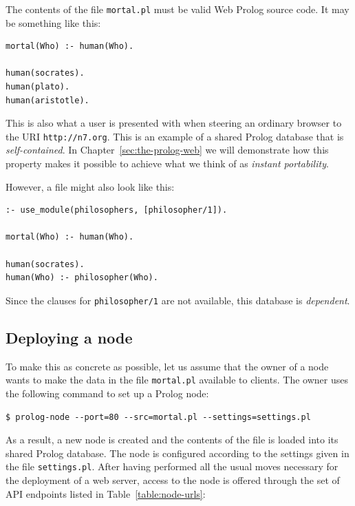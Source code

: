 The contents of the file \texttt{mortal.pl} must be valid Web Prolog source code. It may be something like this:

\begin{verbatim}
mortal(Who) :- human(Who).

human(socrates).
human(plato).
human(aristotle).
\end{verbatim}

\noindent This is also what a user is presented with when steering an ordinary browser to the URI  \texttt{http://n7.org}. This is an example of a shared Prolog database that is  \textit{self-contained}. In Chapter~\ref{sec:the-prolog-web} we will demonstrate how this property makes it possible to achieve what we think of as \textit{instant portability}.

However, a file might also look like this:

\begin{verbatim}
:- use_module(philosophers, [philosopher/1]).

mortal(Who) :- human(Who).

human(socrates).
human(Who) :- philosopher(Who).
\end{verbatim}

\noindent Since the clauses for \texttt{philosopher/1} are not available, this database is \textit{dependent}.

\subsection{Deploying a node}\label{sec:node-setup}

%

\noindent To make this as concrete as possible, let us assume that the owner of a node wants to make the data in the file \texttt{mortal.pl} available to clients. The owner uses the following command to set up a Prolog node:

\begin{verbatim}
$ prolog-node --port=80 --src=mortal.pl --settings=settings.pl
\end{verbatim}

\noindent As a result, a new node is created and the contents of the file is loaded into its shared Prolog database. The node is configured according to the settings given in the file \texttt{settings.pl}. After having performed all the usual moves necessary for the deployment of a web server, access to the node is offered through the set of API endpoints listed in Table~\ref{table:node-urls}:

